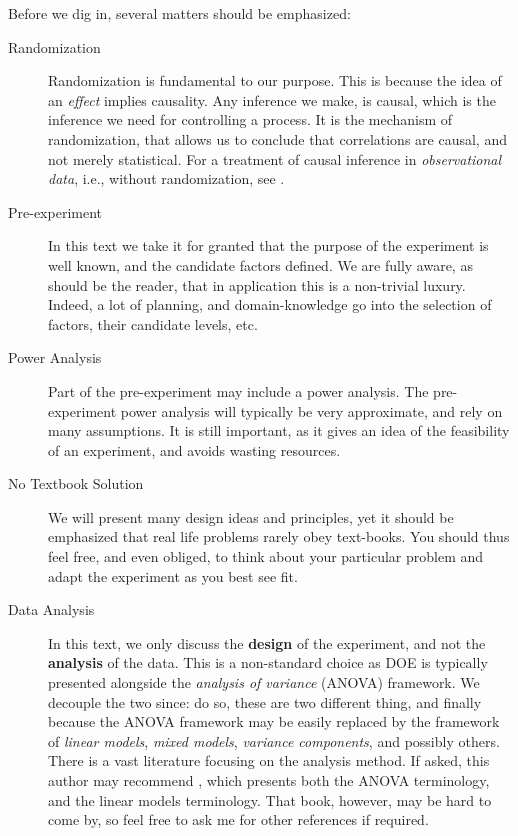 Before we dig in, several matters should be emphasized:
\begin{description}
\item [Randomization] Randomization is fundamental to our purpose. This is because the idea of an \emph{effect} implies causality. Any inference we make, is causal, which is the inference we need for controlling a process.
It is the mechanism of randomization, that allows us to conclude that correlations are causal, and not merely statistical.
For a treatment of causal inference in \emph{observational data}, i.e., without randomization, see \cite{rosenbaum_observational_2002}.

\item [Pre-experiment] In this text we take it for granted that the purpose of the experiment is well known, and the candidate factors defined. We are fully aware, as should be the reader, that in application this is a non-trivial luxury. Indeed, a lot of planning, and domain-knowledge go into the selection of factors, their candidate levels, etc.

\item [Power Analysis] Part of the pre-experiment may include a power analysis. The pre-experiment power analysis will typically be very approximate, and rely on many assumptions. It is still important, as it gives an idea of the feasibility of an experiment, and avoids wasting resources.

\item [No Textbook Solution] We will present many design ideas and principles, yet it should be emphasized that real life problems rarely obey text-books. You should thus feel free, and even obliged, to think about your particular problem and adapt the experiment as you best see fit. 

\item[Data Analysis]
In this text, we only discuss the \textbf{design} of the experiment, and not the \textbf{analysis} of the data.
This is a non-standard choice as DOE is typically presented alongside the \emph{analysis of variance} (ANOVA) framework.
We decouple the two since: 
\cite{cox_theory_2000} do so, 
these are two different thing, and finally because the ANOVA framework may be easily replaced by the framework of \emph{linear models}, \emph{mixed models}, \emph{variance components}, and possibly others. 
There is a vast literature focusing on the analysis method. 
If asked, this author may recommend \cite{hocking_analysis_1985}, which presents both the ANOVA terminology, and the linear models terminology.
That book, however, may be hard to come by, so feel free to ask me for other references if required.

\end{description}








